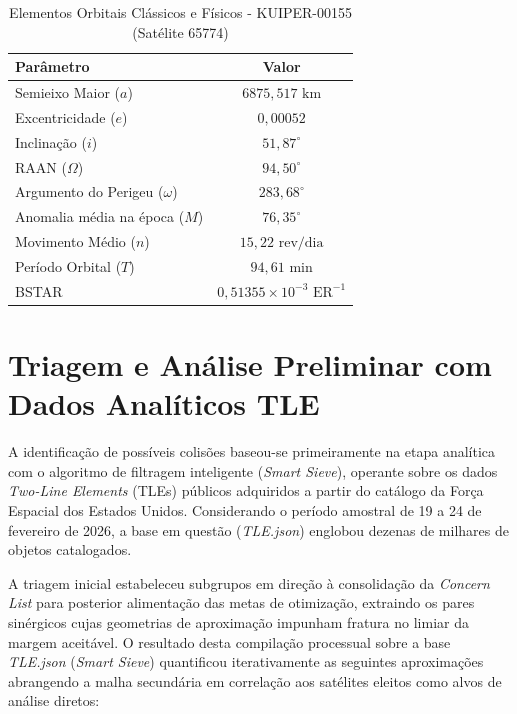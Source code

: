 \begin{table}[H]
    \centering
    \caption{Elementos Orbitais Clássicos e Físicos - KUIPER-00155 (Satélite 65774)}
    \label{tab:sat_65774}
    \begin{tabular}{lc}
        \toprule
        \textbf{Parâmetro} & \textbf{Valor} \\
        \midrule
        Semieixo Maior ($a$) & $6875,517\text{ km}$ \\
        Excentricidade ($e$) & $0,00052$ \\
        Inclinação ($i$) & $51,87^\circ$ \\
        RAAN ($\Omega$) & $94,50^\circ$ \\
        Argumento do Perigeu ($\omega$) & $283,68^\circ$ \\
        Anomalia média na época ($M$) & $76,35^\circ$ \\
        Movimento Médio ($n$) & $15,22\text{ rev/dia}$ \\
        Período Orbital ($T$) & $94,61\text{ min}$ \\
        BSTAR & $0,51355\times 10^{-3} \text{ ER}^{-1}$ \\
        \bottomrule
    \end{tabular}
\end{table}

\section{Triagem e Análise Preliminar com Dados Analíticos TLE}

A identificação de possíveis colisões baseou-se primeiramente na etapa analítica com o algoritmo de filtragem inteligente (\textit{Smart Sieve}), operante sobre os dados \textit{Two-Line Elements} (TLEs) públicos adquiridos a partir do catálogo da Força Espacial dos Estados Unidos. Considerando o período amostral de 19 a 24 de fevereiro de 2026, a base em questão (\textit{TLE.json}) englobou dezenas de milhares de objetos catalogados.

A triagem inicial estabeleceu subgrupos em direção à consolidação da \textit{Concern List} para posterior alimentação das metas de otimização, extraindo os pares sinérgicos cujas geometrias de aproximação impunham fratura no limiar da margem aceitável. O resultado desta compilação processual sobre a base \textit{TLE.json} (\textit{Smart Sieve}) quantificou iterativamente as seguintes aproximações abrangendo a malha secundária em correlação aos satélites eleitos como alvos de análise diretos:

